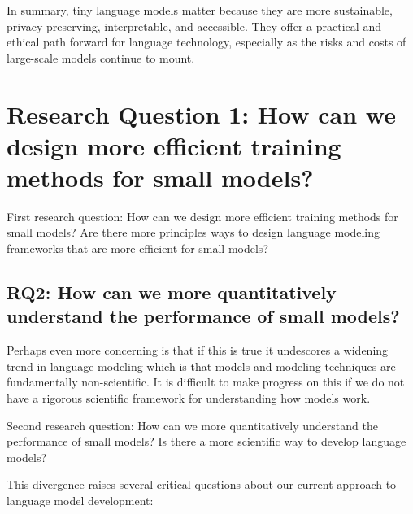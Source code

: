 In summary, tiny language models matter because they are more sustainable, privacy-preserving, interpretable, and accessible. They offer a practical and ethical path forward for language technology, especially as the risks and costs of large-scale models continue to mount.

\section{Research Question 1: How can we design more efficient training methods for small models?}



First research question: How can we design more efficient training methods for small models? Are there more principles ways to design language modeling frameworks that are more efficient for small models? 

\subsection{RQ2: How can we more quantitatively understand the performance of small models?}


Perhaps even more concerning is that if this is true it undescores a widening trend in language modeling which is that models and modeling techniques are fundamentally non-scientific. It is difficult to make progress on this if we do not have a rigorous scientific framework for understanding how models work. 

Second research question: How can we more quantitatively understand the performance of small models? Is there a more scientific way to develop language models? 


This divergence raises several critical questions about our current approach to language model development:

